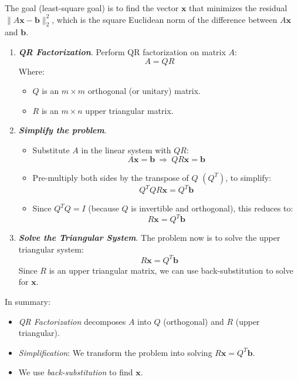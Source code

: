 \begin{enumerate}[label=\textcolor{Green3}{\textbf{\arabic*.}}]
    The goal (least-square goal) is to find the vector $\mathbf{x}$ that minimizes the residual $\|A\mathbf{x} - \mathbf{b}\|_{2}^{2}$, which is the square Euclidean norm of the difference between $A\mathbf{x}$ and $\mathbf{b}$.
    
    \begin{enumerate}
        \item \textbf{\emph{QR Factorization}}. Perform QR factorization on matrix $A$:
        \[ A = QR \]
        Where:
        \begin{itemize}
            \item $Q$ is an $m \times m$ orthogonal (or unitary) matrix.
            \item $R$ is an $m \times n$ upper triangular matrix.
        \end{itemize}

        \item \textbf{\emph{Simplify the problem}}.
        \begin{itemize}
            \item Substitute $A$ in the linear system with $QR$:
            \begin{equation*}
                A\mathbf{x} = \mathbf{b} \: \Rightarrow \: QR\mathbf{x} = \mathbf{b}
            \end{equation*}
            \item Pre-multiply both sides by the transpose of $Q$ $\left(Q^{T}\right)$, to simplify:
            \begin{equation*}
                Q^{T} QR\mathbf{x} = Q^{T} \mathbf{b}
            \end{equation*}
            \item Since $Q^{T} Q = I$ (because $Q$ is invertible and orthogonal), this reduces to:
            \begin{equation*}
                R\mathbf{x} = Q^{T} \mathbf{b}
            \end{equation*}
        \end{itemize}

        \item \textbf{\emph{Solve the Triangular System}}. The problem now is to solve the upper triangular system:
        \[ R\mathbf{x} = Q^{T} \mathbf{b} \]
        Since $R$ is an upper triangular matrix, we can use back-substitution to solve for $\mathbf{x}$.
    \end{enumerate}
    In summary:
    \begin{itemize}
        \item \emph{QR Factorization} decomposes $A$ into $Q$ (orthogonal) and $R$ (upper triangular).
        \item \emph{Simplification}: We transform the problem into solving $R\mathbf{x} = Q^{T} \mathbf{b}$.
        \item We use \emph{back-substitution} to find $\mathbf{x}$.
    \end{itemize}
\end{enumerate}


